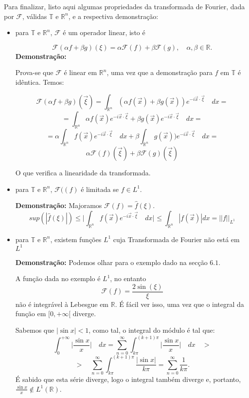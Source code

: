 \documentclass{article}
\begin{document}
Para finalizar, listo aqui algumas propriedades da transformada de Fourier, dada por \(\mathcal{F}\), válidas \(\mathbb{T}\) e \(\mathbb{R}^{n}\), e a respectiva demonstração:
\begin{itemize}
    \item para \(\mathbb{T}\) e \(\mathbb{R}^{n}\), \(\mathcal{F}\) é um operador linear, isto é
    
    \[\mathcal{F}(\alpha f+\beta g)(\xi)=\alpha\mathcal{F}(f)+\beta\mathcal{F}(g),\quad\alpha,\beta\in\mathbb{R}.\] 
    \textbf{Demonstração:}
    
    Prova-se que \(\mathcal{F}\) é linear em \(\mathbb{R}^{n}\), uma vez que a demonstração para \(f\) em \(\mathbb{T}\) é idêntica. Temos:
    
    \[\mathcal{F}(\alpha f+\beta g)(\vec{\xi})=\displaystyle\int_{\mathbb{R}^{n}}(\alpha f(\vec{x})+\beta g(\vec{x}))e^{-i\vec{x}\cdot\vec{\xi}}\quad dx=\]
    \[=\displaystyle\int_{\mathbb{R}^{n}}\alpha f(\vec{x})e^{-i\vec{x}\cdot\vec{\xi}}+\beta g(\vec{x})e^{-i\vec{x}\cdot\vec{\xi}}\quad dx=\]
    \[=\alpha\displaystyle\int_{\mathbb{R}^{n}}f(\vec{x})e^{-i\vec{x}\cdot\vec{\xi}}\quad dx +\beta\displaystyle\int_{\mathbb{R}^{n}}g(\vec{x}))e^{-i\vec{x}\cdot\vec{\xi}}\quad dx=\]
    \[\alpha\mathcal{F}(f)(\vec{\xi})+\beta\mathcal{F}(g)(\vec{\xi})\]
    
    O que verifica a linearidade da transformada.
    \item para \(\mathbb{T}\) e \(\mathbb{R}^{n}\), \(\mathcal{F}((f)\) é limitada se \(f\in L^{1}\).
    
\textbf{Demonstração:}
Majoramos\cite{maggie2} \(\mathcal{F}(f)=\hat{f}(\xi)\).
\[sup(|\hat{f}(\xi)|)\leq \Biggr|_{}\displaystyle\int_{\mathbb{R}^{n}}f(\vec{x})e^{-i\vec{x}\cdot\vec{\xi}}\quad dx\Biggr|_{}\leq\displaystyle\int_{\mathbb{R}^{n}}|f(\vec{x})| dx = ||f||_{L^{1}}\]
    \item para \(\mathbb{T}\) e \(\mathbb{R}^{n}\), existem funções \(L^{1}\) cuja Transformada de Fourier não está em \(L^{1}\)
    
\textbf{Demonstração:}
Podemos olhar para o exemplo dado na secção \(\mathbf{6.1}\).

A função dada no exemplo é \(L^{1}\), no entanto
\[\mathcal{F}(f)= \frac{2\sin(\xi)}{\xi}\] não é integrável à Lebesgue em \(\mathbb{R}\). É fácil ver isso, uma vez que o integral da função em \([0,+\infty[\) diverge.

Sabemos que \(|\sin{x}|<1\), como tal, o integral do módulo é tal que:
\[\displaystyle\int_{0}^{+\infty}\Biggr| \frac{\sin{x}}{x}\Biggr|\quad dx= \displaystyle\sum_{n=0}^{\infty}\displaystyle\int_{k\pi}^{(k+1)\pi}\Biggr| \frac{\sin{x}}{x}\Biggr|\quad dx\quad >\]
\[>\quad\displaystyle\sum_{n=0}^{\infty}\displaystyle\int_{k\pi}^{(k+1)\pi}\frac{|\sin{x}|}{k\pi}=\displaystyle\sum_{n=0}^{\infty}\frac{1}{k\pi}.\]
É sabido que esta série diverge, logo o integral também diverge e, portanto, \(\frac{\sin{x}}{x}\notin L^{1}(\mathbb{R})\).

\end{itemize}

\printbibliography[title={Referências}]
\end{document}
